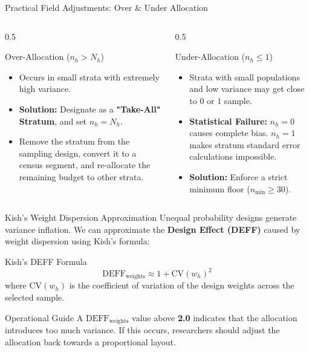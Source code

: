 \documentclass[10pt, aspectratio=169]{beamer}
\begin{document}
  \begin{frame}{Practical Field Adjustments: Over \& Under Allocation}
      \begin{columns}
          \begin{column}{0.5\textwidth}
              \begin{block}{Over-Allocation ($n_h > N_h$)}
                  \begin{itemize}
                      \item Occurs in small strata with extremely high variance.
                      \item \textbf{Solution:} Designate as a \textbf{"Take-All" Stratum}, and set $n_h = N_h$.
                      \item Remove the stratum from the sampling design, convert it to a census segment, and re-allocate the remaining budget to other strata.
                  \end{itemize}
              \end{block}
          \end{column}
          \begin{column}{0.5\textwidth}
              \begin{block}{Under-Allocation ($n_h \le 1$)}
                  \begin{itemize}
                      \item Strata with small populations and low variance may get close to $0$ or $1$ sample.
                      \item \textbf{Statistical Failure:} $n_h = 0$ causes complete bias. $n_h = 1$ makes stratum standard error calculations impossible.
                      \item \textbf{Solution:} Enforce a strict minimum floor ($n_{\min} \ge 30$).
                  \end{itemize}
              \end{block}
          \end{column}
      \end{columns}
  \end{frame}
  
  \begin{frame}{Kish's Weight Dispersion Approximation}
      Unequal probability designs generate variance inflation. We can approximate the \textbf{Design Effect (DEFF)} caused by weight dispersion using Kish's formula:
      
      \begin{block}{Kish's DEFF Formula}
          $$\text{DEFF}_{\text{weights}} \approx 1 + \text{CV}(w_h)^2$$
          where $\text{CV}(w_h)$ is the coefficient of variation of the design weights across the selected sample.
      \end{block}
      
      \begin{alertblock}{Operational Guide}
          A $\text{DEFF}_{\text{weights}}$ value above \textbf{2.0} indicates that the allocation introduces too much variance. If this occurs, researchers should adjust the allocation back towards a proportional layout.
      \end{alertblock}
  \end{frame}
  
\end{document}

